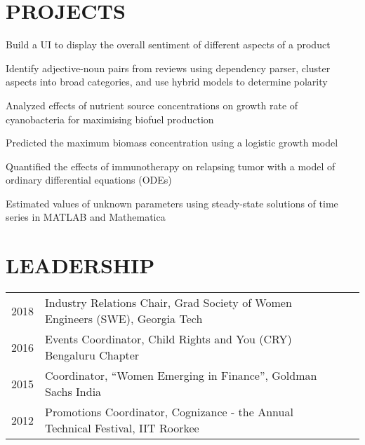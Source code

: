 \documentclass[]{deedy-resume-openfont}
\begin{document}
\begin{minipage}[t]{0.66\textwidth}
\begin{tightemize}
\end{tightemize}
\sectionsep


\section{PROJECTS}
\begin{tightemize}
\item Build a UI to display the overall sentiment of different aspects of a product
\item Identify adjective-noun pairs from reviews using dependency parser, cluster aspects into broad categories, and use hybrid models to determine polarity
\end{tightemize}
\sectionsep

\begin{tightemize}
\item Analyzed effects of nutrient source concentrations on growth rate of cyanobacteria for maximising biofuel production
\item Predicted the maximum biomass concentration using a logistic growth model
\end{tightemize}
\sectionsep

\begin{tightemize}
\item Quantified the effects of immunotherapy on relapsing tumor with a model of ordinary differential equations (ODEs) 
\item Estimated values of unknown parameters using steady-state solutions of time series in MATLAB and Mathematica
\end{tightemize}
\sectionsep


\section{LEADERSHIP} 

\begin{tabular}{rll}
2018 & Industry Relations Chair, Grad Society of Women Engineers (SWE), Georgia Tech \\                  
2016 & Events Coordinator, Child Rights and You (CRY) Bengaluru Chapter \\
2015 & Coordinator, “Women Emerging in Finance”, Goldman Sachs India \\
2012 & Promotions Coordinator, Cognizance - the Annual Technical Festival, IIT Roorkee\\
\end{tabular}
\sectionsep

\end{minipage} 
\end{document}
